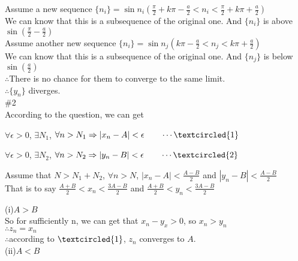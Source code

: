 \documentclass{article}
\begin{document}
Assume a new sequence $\{n_i\}=\sin{n_i}(\frac{\pi}{2}+k\pi-\frac{a}{2}<n_i<\frac{\pi}{2}+k\pi+\frac{a}{2})$\\

We can know that this is a subsequence of the original one. And $\{n_i\}$ is above $\sin{(\frac{\pi}{2}-\frac{a}{2})}$\\

Assume another new sequence $\{n_i\}=\sin{n_j}(k\pi-\frac{a}{2}<n_j<k\pi+\frac{a}{2})$\\

We can know that this is a subsequence of the original one. And $\{n_j\}$ is below $\sin{(\frac{a}{2})}$\\

$\therefore$\qquad There is no chance for them to converge to the same limit.\\

$\therefore$\qquad $\{y_n\}$ diverges.\\

\textcolor[rgb]{0.00,0.00,0.50}{\#2}\\

According to the question, we can get\\

\centerline{$\forall\epsilon>0$, $\exists N_1$, $\forall n>N_1\Rightarrow\left|x_n-A\right|<\epsilon\qquad\cdots\textcircled{1}$}
\centerline{$\forall\epsilon>0$, $\exists N_2$, $\forall n>N_2\Rightarrow\left|y_n-B\right|<\epsilon\qquad\cdots\textcircled{2}$}

\vspace{3.5mm}

Assume that $N>N_1+N_2$, $\forall n>N$, $\left|x_n-A\right|<\frac{A-B}{2}$ and $\left|y_n-B\right|<\frac{A-B}{2}$\\

That is to say $\frac{A+B}{2}<x_n<\frac{3A-B}{2}$ and $\frac{A+B}{2}<y_n<\frac{3A-B}{2}$

(i)$A>B$\\

So for sufficiently n, we can get that $x_n-y_x>0$, so $x_n>y_n$\\

$\therefore$\qquad $z_n=x_n$\\

$\therefore$\qquad according to $\textcircled{1}$, $z_n$ converges to $A$.\\

(ii)$A<B$\\
\end{document}
